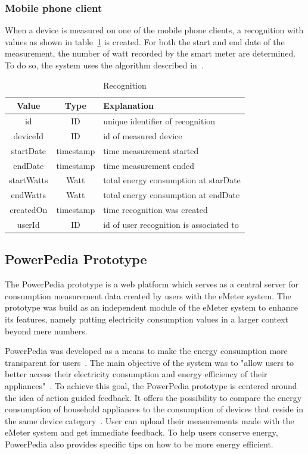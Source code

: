 \subsubsection{Mobile phone client}
When a device is measured on one of the mobile phone clients, a recognition with values as shown in table~\ref{recognition} is created. For both the start and end date of the measurement, the number of watt recorded by the smart meter are determined. To do so, the system uses the algorithm described in~\cite{weiss:inprocPUC:2012}. 

\begin{table}[htdp]
\caption{Recognition}
\begin{center}
\begin{tabular}{|c|c|p{5cm}|}
\hline
Value & Type & Explanation\\
\hline
\hline
id & ID & unique identifier of recognition \\
deviceId & ID & id of measured device \\ 
startDate & timestamp & time measurement started \\
endDate & timestamp & time measurement ended\\
startWatts & Watt & total energy consumption at starDate  \\
endWatts & Watt & total energy consumption at endDate \\
createdOn & timestamp & time recognition was created\\
userId & ID & id of user recognition is associated to \\
\end{tabular}
\end{center}
\label{recognition}
\end{table}%


\subsection{PowerPedia Prototype}
The PowerPedia prototype is a web platform which serves as a central server for consumption measurement data created by users with the eMeter system. The prototype was build as an independent module of the eMeter system to enhance its features, namely putting electricity consumption values in a larger context beyond mere numbers.

PowerPedia was developed as a means to make the energy consumption more transparent for users~\cite{merklepp}. The main objective of the system was to "allow users to better access their electricity consumption and energy efficiency of their appliances"~\cite{weiss:inprocPUC:2012}. To achieve this goal, the PowerPedia prototype is centered around the idea of action guided feedback. It offers the possibility to compare the energy consumption of household appliances to the consumption of devices that reside in the same device category~\cite{merklepp}. User can upload their measurements made with the eMeter system and get immediate feedback. To help users conserve energy, PowerPedia also provides specific tips on how to be more energy efficient.

